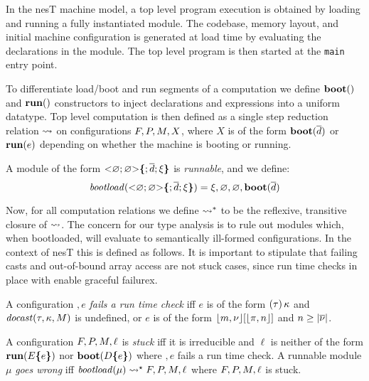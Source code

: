 In the nesT machine model, a top level program execution is obtained
by loading and running a fully instantiated module. The codebase,
memory layout, and initial machine 
configuration is generated at load time by evaluating the declarations
in the module. The top level program is then started at the
\texttt{main} entry point.

To differentiate load/boot and run segments of a computation we define
$\mathbf{boot}()$ and $\mathbf{run}()$ 
constructors to inject declarations and
expressions into a uniform datatype. Top level computation is 
then defined as a single step reduction relation $\leadsto$ on
configurations  $F,P,M,X$, where $X$ is of the form
$\mathbf{boot}(\overline{d})$ or $\mathbf{run}(e)$ depending on whether the
machine is booting or running.
\begin{definition}
A module of the form $\mathrm{<}\varnothing; \varnothing \mathrm{>}\textup{\textbf{\{}} ;
\overline{d}; \xi\textup{\textbf{\}}}$  is \emph{runnable}, and we define:
$$\mathit{bootload}(\mathrm{<}\varnothing; \varnothing \mathrm{>}\textup{\textbf{\{}} ; \overline{d}; \xi\textup{\textbf{\}}}) =
\xi,\varnothing,\varnothing, \mathbf{boot}(\overline{d})$$
\end{definition}

Now, for all computation relations we define $\leadsto^*$ to be the
reflexive, transitive closure of $\leadsto$. The concern for our type
analysis is to rule out modules which, when bootloaded, will evaluate
to semantically ill-formed configurations. In the context of nesT this
is defined as follows. It is important to stipulate that failing casts
and out-of-bound array access are not stuck cases, since run time
checks in place with enable graceful failurex.
\begin{definition}
A configuration $\bm, e$ \emph{fails a run time check} iff $e$ is of
the form $(\tau)\,\kappa$ and $\mathit{docast}(\tau,\kappa,M)$ is
undefined, or $e$ is of the form $\lfloor m,{\nu} \rfloor[\lfloor \pi,n \rfloor]$ and 
$n\ge|\overline{{\nu}}|$.
\end{definition}

\begin{definition}
\label{def-runnable}
A configuration $F, P, M, \ell$ is \emph{stuck} iff it is
irreducible and $\ell$ is neither of the form $\mathbf{run}(E\textup{\textbf{\{}} e\textup{\textbf{\}}})$ 
nor $\mathbf{boot}(D\textup{\textbf{\{}} e\textup{\textbf{\}}})$ 
where $\bm, e$ fails a run time check. A runnable
module $\mu$ \emph{goes wrong} iff
$\mathit{bootload}(\mu) \leadsto^\star F, P, M, \ell $ 
where $F, P, M, \ell$ is stuck.
\end{definition}


